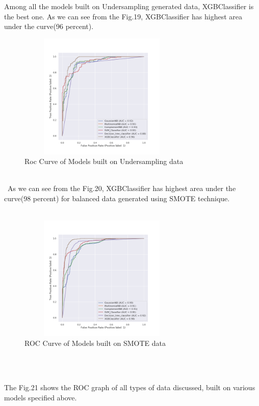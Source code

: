 \documentclass[a4paper, 10pt, conference]{ieeeconf}      %
\begin{document}
Among all the models built on Undersampling  generated data, XGBClassifier is the best one. As we can see from the Fig.19, XGBClassifier has highest area under the curve(96 percent).

\begin{figure}[htp]
    \centering
    \includegraphics[width=8cm,height=6cm]{Images/Roc_with_undersampling_final.png}
    \caption{Roc Curve of Models built on Undersampling data}
    \label{fig:Roc Curve of Models built on Undersampling data}
\end{figure}
\\\
As we can see from the Fig.20, XGBClassifier has highest area under the curve(98 percent) for balanced data generated using SMOTE technique.
\\\

\begin{figure}[htp]
    \centering
    \includegraphics[width=8cm,height=6cm]{Images/Roc_with_SMOTE_final.png}
    \caption{ROC Curve of Models built on SMOTE data}
    \label{fig:Roc Curve of Models built on SMOTE data}
\end{figure}
\\\

The Fig.21 shows the ROC graph of all types of data discussed, built on various models specified above. 
\end{document}
